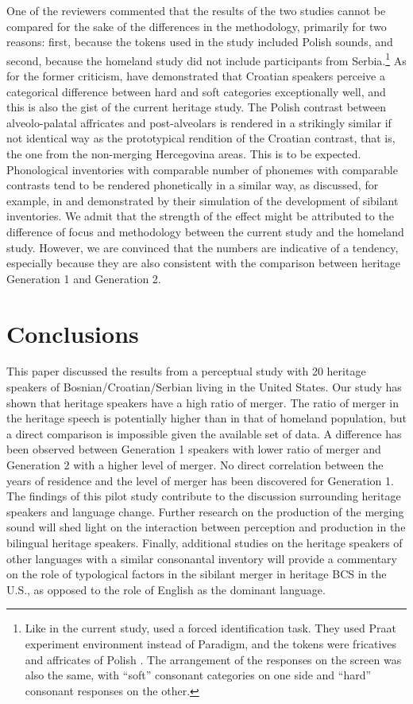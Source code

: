 \documentclass[output=paper,
modfonts,
newtxmath,
hidelinks,
]{langscibook}
\begin{document}
  
One of the reviewers commented that the results of the two studies cannot be compared for the sake of the differences in the methodology, primarily for two reasons: first, because the tokens used in the \citet{Cavar-Hamann2011} study included Polish sounds, and second, because the homeland study did not include participants from Serbia.\footnote{Like in the current study, \citeauthor{Cavar-Hamann2011} used a forced identification task. They used Praat experiment environment instead of Paradigm, and the tokens were fricatives and affricates of Polish \citep{Boersma-Weenink_praat}. The arrangement of the responses on the screen was also the same, with “soft” consonant categories on one side and “hard” consonant responses on the other.} As for the former criticism, \citet{Cavar-Hamann2011} have demonstrated that Croatian speakers perceive a categorical difference between hard and soft categories exceptionally well, and this is also the gist of the current heritage study. The Polish contrast between alveolo-palatal affricates and post-alveolars is rendered in a strikingly similar if not identical way as the prototypical rendition of the Croatian contrast, that is, the one from the non-merging Hercegovina areas. This is to be expected. Phonological inventories with comparable number of phonemes with comparable contrasts tend to be rendered phonetically in a similar way, as discussed, for example, in \citet{Boersma-Hamann2008} and demonstrated by their simulation of the development of sibilant inventories. We admit that the strength of the effect might be attributed to the difference of focus and methodology between the current study and the homeland study. However, we are convinced that the numbers are indicative of a tendency, especially because they are also consistent with the comparison between heritage Generation 1 and Generation 2.


\section{Conclusions}\label{sec:mihajlovic:7}

This paper discussed the results from a perceptual study with 20 heritage speakers of Bosnian/Croatian/Serbian living in the United States. Our study has shown that heritage speakers have a high ratio of merger. The ratio of merger in the heritage speech is potentially higher than in that of homeland population, but a direct comparison is impossible given the available set of data. {A} difference has been observed between Generation 1 speakers with lower ratio of merger and Generation 2 with a higher level of merger. No direct correlation between the years of residence and the level of merger has been discovered for Generation 1. The findings of this pilot study contribute to the discussion surrounding heritage speakers and language change. Further research on the production of the merging sound will shed light on the interaction between perception and production in the bilingual heritage speakers. Finally, additional studies on the heritage speakers of other languages with a similar consonantal inventory will provide a commentary on the role of typological factors in the sibilant merger in heritage BCS in the U.S., as opposed to the role of English as the dominant language.
\end{document}

